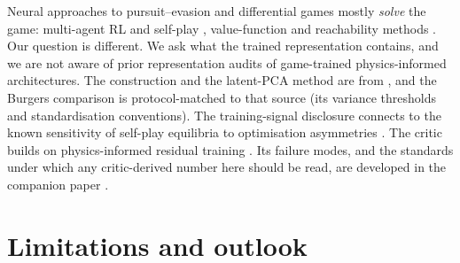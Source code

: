 \documentclass[twoside,11pt]{article}
\begin{document}
Neural approaches to pursuit--evasion and differential games mostly
\emph{solve} the game: multi-agent RL and self-play
\citep{lowe2017maddpg, baker2020emergent}, value-function and
reachability methods \citep{bansaltomlin2021deepreach}.  Our question
is different.  We ask what the trained representation contains, and we
are not aware of prior representation audits of game-trained
physics-informed architectures.  The construction and the latent-PCA
method are from \citet{JimenezEmbeddings2026}, and the Burgers
comparison is protocol-matched to that source (its variance thresholds
and standardisation conventions).  The training-signal disclosure
connects to the known sensitivity of self-play equilibria to
optimisation asymmetries \citep{mescheder2018gan,
daskalakis2018training}.  The critic builds on physics-informed
residual training \citep{Raissi2019, Karniadakis2021}.  Its failure
modes, and the standards under which any critic-derived number here
should be read, are developed in the companion paper
\citep{companion2026critics}.

\section{Limitations and outlook}
\label{sec:limits}
\end{document}
